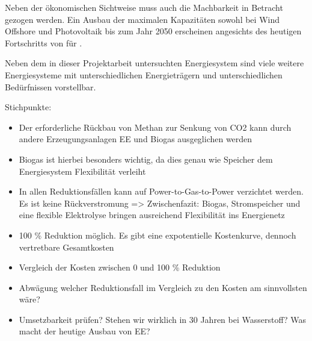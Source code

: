 Neben der ökonomischen Sichtweise muss auch die Machbarkeit in Betracht gezogen werden.
Ein Ausbau der maximalen Kapazitäten sowohl bei Wind Offshore und Photovoltaik bis zum Jahr 2050 erscheinen angesichts des heutigen Fortschritts von  für .

Neben dem in dieser Projektarbeit untersuchten Energiesystem sind viele weitere Energiesysteme mit unterschiedlichen Energieträgern und unterschiedlichen Bedürfnissen vorstellbar. 

Stichpunkte:
\begin{itemize}
  \item Der erforderliche Rückbau von Methan zur Senkung von CO2 kann durch andere Erzeugungsanlagen EE und Biogas ausgeglichen werden
  \item Biogas ist hierbei besonders wichtig, da dies genau wie Speicher dem Energiesystem Flexibilität verleiht
  \item In allen Reduktionsfällen kann auf Power-to-Gas-to-Power verzichtet werden. Es ist keine Rückverstromung => Zwischenfazit: Biogas, Stromspeicher und eine flexible Elektrolyse bringen ausreichend Flexibilität ins Energienetz
  \item 100 \% Reduktion möglich. Es gibt eine expotentielle Kostenkurve, dennoch vertretbare Gesamtkosten
  \item Vergleich der Kosten zwischen 0 und 100 \% Reduktion 
  \item Abwägung welcher Reduktionsfall im Vergleich zu den Kosten am sinnvollsten wäre?
  \item Umsetzbarkeit prüfen? Stehen wir wirklich in 30 Jahren bei Wasserstoff? Was macht der heutige Ausbau von EE? 
\end{itemize}



